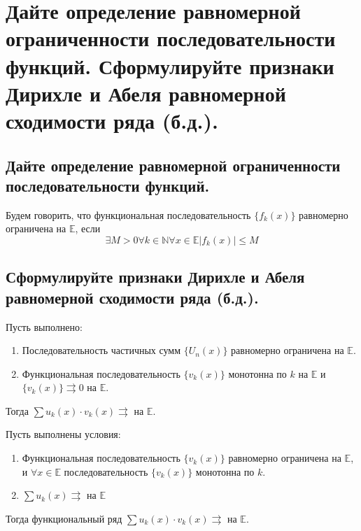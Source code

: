 \section{Дайте определение равномерной ограниченности последовательности функций. Сформулируйте признаки Дирихле и Абеля равномерной сходимости ряда (б.д.).}

\subsection{Дайте определение равномерной ограниченности последовательности функций.}
\begin{definition}
    Будем говорить, что функциональная последовательность $\{f_k(x)\}$ равномерно ограничена на $\mathbb{E}$, если
    \[
        \exists M > 0
        \forall k \in \mathbb{N}
        \forall x \in \mathbb{E}
        |f_k(x)| \leqslant M
    \]
\end{definition}

\subsection{Сформулируйте признаки Дирихле и Абеля равномерной сходимости ряда (б.д.).}
\begin{theorem}
    Пусть выполнено:
    \begin{enumerate}
        \item Последовательность частичных сумм $\{U_n(x)\}$ равномерно ограничена на $\mathbb{E}$.
        \item Функциональная последовательность $\{v_k(x)\}$ монотонна по $k$ на $\mathbb{E}$ и $\{v_k(x)\} \rightrightarrows 0$ на $\mathbb{E}$.
    \end{enumerate}
    Тогда $\sum u_k(x) \cdot v_k(x) \rightrightarrows$ на $\mathbb{E}$.
\end{theorem}

\begin{theorem}
    Пусть выполнены условия:
    \begin{enumerate}
        \item Функциональная последовательность $\{v_k(x)\}$ равномерно ограничена на $\mathbb{E}$, и $\forall x \in \mathbb{E}$ последовательность $\{v_k(x)\}$ монотонна по $k$.
        \item $\sum u_k(x) \rightrightarrows$ на $\mathbb{E}$
    \end{enumerate}
    Тогда функциональный ряд $\sum u_k(x) \cdot v_k(x) \rightrightarrows$ на $\mathbb{E}$.
\end{theorem}